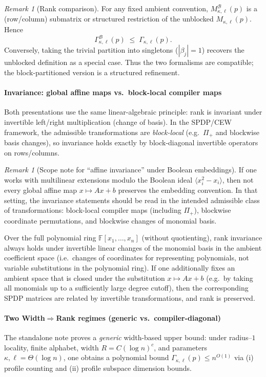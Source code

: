 \documentclass[12pt]{article}
\theoremstyle{definition}
\theoremstyle{remark}
\newtheorem{remark}[theorem]{Remark}
\begin{document}
\begin{remark}[Rank comparison]
\label{rem:rank-comparison}
For any fixed ambient convention, $M^{\mathcal{B}}_{\kappa,\ell}(p)$ is a
(row/column) submatrix or structured restriction of the unblocked
$M_{\kappa,\ell}(p)$. Hence
\[
  \Gamma^{\mathcal{B}}_{\kappa,\ell}(p)\;\le\;\Gamma_{\kappa,\ell}(p).
\]
Conversely, taking the trivial partition into singletons ($|\beta_j|=1$) recovers
the unblocked definition as a special case. Thus the two formalisms are
compatible; the block-partitioned version is a structured refinement.
\end{remark}

\paragraph{Invariance: global affine maps vs.\ block-local compiler maps}
Both presentations use the same linear-algebraic principle:
rank is invariant under invertible left/right multiplication (change of basis).
In the SPDP/CEW framework, the admissible transformations are \emph{block-local}
(e.g.\ $\Pi_+$ and blockwise basis changes), so invariance holds exactly by
block-diagonal invertible operators on rows/columns.

\begin{remark}[Scope note for ``affine invariance'' under Boolean embeddings]
\label{rem:affine-scope}
If one works with multilinear extensions modulo the Boolean ideal
$\langle x_i^2-x_i\rangle$, then not every global affine map $x\mapsto Ax+b$
preserves the embedding convention. In that setting, the invariance statements
should be read in the intended admissible class of transformations:
block-local compiler maps (including $\Pi_+$), blockwise coordinate
permutations, and blockwise changes of monomial basis.

Over the full polynomial ring $\mathbb{F}[x_1,\dots,x_n]$ (without quotienting),
rank invariance always holds under invertible linear changes of the monomial
basis in the ambient coefficient space (i.e.\ changes of coordinates for
representing polynomials, not variable substitutions in the polynomial ring).
If one additionally fixes an ambient space that is closed under the substitution
$x\mapsto Ax+b$ (e.g.\ by taking all monomials up to a sufficiently large degree
cutoff), then the corresponding SPDP matrices are related by invertible
transformations, and rank is preserved.
\end{remark}

\paragraph{Two Width$\Rightarrow$Rank regimes (generic vs.\ compiler-diagonal)}
The standalone note proves a \emph{generic} width-based upper bound:
under radius--$1$ locality, finite alphabet, width $R=C(\log n)^c$, and
parameters $\kappa,\ell=\Theta(\log n)$, one obtains a polynomial bound
$\Gamma_{\kappa,\ell}(p)\le n^{O(1)}$ via (i) profile counting and
(ii) profile subspace dimension bounds.
\end{document}
